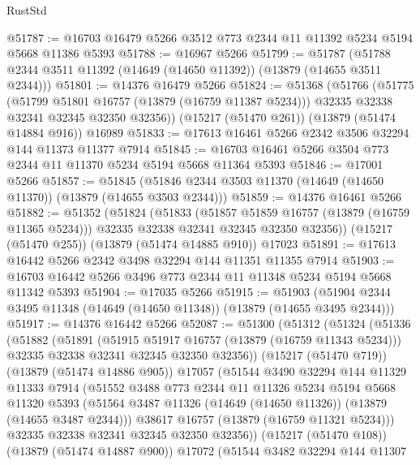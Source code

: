 \begin{lexlean}{RustStd}
\begin{coremodule}
@51787 := @16703 @16479 @5266 @3512 @773 @2344 @11 @11392 @5234 @5194 @5668 @11386 @5393
@51788 := @16967 @5266
@51799 := @51787 (@51788 @2344 @3511 @11392 (@14649 (@14650 @11392)) (@13879 (@14655 @3511 @2344)))
@51801 := @14376 @16479 @5266
@51824 := @51368
    (@51766
      (@51775
        (@51799 @51801 @16757 (@13879 (@16759 @11387 @5234)))
        @32335
        @32338
        @32341
        @32345
        @32350
        @32356))
    (@15217 (@51470 @261))
    (@13879 (@51474 @14884 @916))
    @16989
@51833 := @17613 @16461 @5266 @2342 @3506 @32294 @144 @11373 @11377 @7914
@51845 := @16703 @16461 @5266 @3504 @773 @2344 @11 @11370 @5234 @5194 @5668 @11364 @5393
@51846 := @17001 @5266
@51857 := @51845 (@51846 @2344 @3503 @11370 (@14649 (@14650 @11370)) (@13879 (@14655 @3503 @2344)))
@51859 := @14376 @16461 @5266
@51882 := @51352
    (@51824
      (@51833
        (@51857 @51859 @16757 (@13879 (@16759 @11365 @5234)))
        @32335
        @32338
        @32341
        @32345
        @32350
        @32356))
    (@15217 (@51470 @255))
    (@13879 (@51474 @14885 @910))
    @17023
@51891 := @17613 @16442 @5266 @2342 @3498 @32294 @144 @11351 @11355 @7914
@51903 := @16703 @16442 @5266 @3496 @773 @2344 @11 @11348 @5234 @5194 @5668 @11342 @5393
@51904 := @17035 @5266
@51915 := @51903 (@51904 @2344 @3495 @11348 (@14649 (@14650 @11348)) (@13879 (@14655 @3495 @2344)))
@51917 := @14376 @16442 @5266
@52087 := @51300
    (@51312
      (@51324
        (@51336
          (@51882
            (@51891
              (@51915 @51917 @16757 (@13879 (@16759 @11343 @5234)))
              @32335
              @32338
              @32341
              @32345
              @32350
              @32356))
          (@15217 (@51470 @719))
          (@13879 (@51474 @14886 @905))
          @17057
          (@51544
            @3490
            @32294
            @144
            @11329
            @11333
            @7914
            (@51552
              @3488
              @773
              @2344
              @11
              @11326
              @5234
              @5194
              @5668
              @11320
              @5393
              (@51564 @3487 @11326 (@14649 (@14650 @11326)) (@13879 (@14655 @3487 @2344)))
              @38617
              @16757
              (@13879 (@16759 @11321 @5234)))
            @32335
            @32338
            @32341
            @32345
            @32350
            @32356))
        (@15217 (@51470 @108))
        (@13879 (@51474 @14887 @900))
        @17072
        (@51544
          @3482
          @32294
          @144
          @11307

\end{coremodule}
\end{lexlean}
